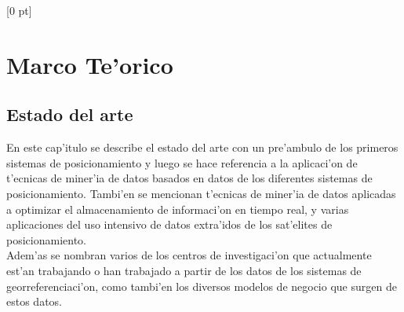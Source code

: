 \titlespacing{\chapter}{0 pt}{30 pt}{50 pt}[0 pt]
\titleformat{\section}{\Large\bfseries}{\thesection}{0 pt}{\hspace{30 pt}}
\titleformat{\subsection}{\large\bfseries}{\thesubsection}{0 pt}{\hspace{30 pt}}
\pagestyle{fancy}
\fancyhead[LO,LE]{\footnotesize\textit{\leftmark}}
\fancyhead[RO,RE]{\thepage}
\fancyfoot[CO,CE]{}

\chapter{Marco Te'orico} %

\normalsize

\section{Estado del arte}
\noindent
En este cap'itulo se describe el estado del arte con un pre'ambulo de los primeros sistemas de posicionamiento y luego se hace referencia a la aplicaci'on de t'ecnicas de miner'ia de datos basados en datos de los diferentes sistemas de posicionamiento. Tambi'en se mencionan t'ecnicas de miner'ia de datos aplicadas a optimizar el almacenamiento de informaci'on en tiempo real, y varias aplicaciones del uso intensivo de datos extra'idos de los sat'elites de posicionamiento.\\

Adem'as se nombran varios de los centros de investigaci'on que actualmente est'an trabajando o han trabajado a partir de los datos de los sistemas de georreferenciaci'on, como tambi'en los diversos modelos de negocio que surgen de estos datos.

